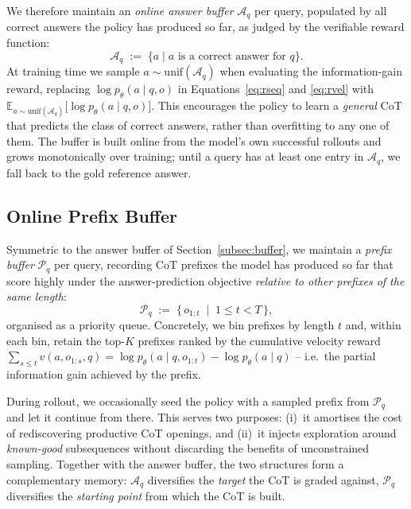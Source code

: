 \documentclass{article}
\begin{document}
We therefore maintain an \emph{online answer buffer} \(\mathcal{A}_q\) per
query, populated by all correct answers the policy has produced so far, as
judged by the verifiable reward function:
\begin{equation}
\mathcal{A}_q \;:=\; \{a \mid a \text{ is a correct answer for } q\}.
\label{eq:buffer}
\end{equation}
At training time we sample \(a \sim \mathrm{unif}(\mathcal{A}_q)\) when
evaluating the information-gain reward, replacing
\(\log p_\theta(a \mid q, o)\) in Equations~\ref{eq:rseq} and \ref{eq:rvel}
with
\(\mathbb{E}_{a \sim \mathrm{unif}(\mathcal{A}_q)}\!\bigl[\log p_\theta(a \mid q, o)\bigr]\).
This encourages the policy to learn a \emph{general} CoT that predicts the
class of correct answers, rather than overfitting to any one of them. The
buffer is built online from the model's own successful rollouts and grows
monotonically over training; until a query has at least one entry in
\(\mathcal{A}_q\), we fall back to the gold reference answer.

\subsection{Online Prefix Buffer}
\label{subsec:prefix}

Symmetric to the answer buffer of Section~\ref{subsec:buffer}, we maintain a
\emph{prefix buffer} \(\mathcal{P}_q\) per query, recording CoT prefixes the
model has produced so far that score highly under the answer-prediction objective
\emph{relative to other prefixes of the same length}:
\begin{equation}
\mathcal{P}_q \;:=\; \{\, o_{1:t} \;\mid\; 1 \le t < T \,\},
\label{eq:prefix-buffer}
\end{equation}
organised as a priority queue. Concretely, we bin prefixes by length \(t\)
and, within each bin, retain the top-\(K\) prefixes ranked by the cumulative
velocity reward
\(\sum_{s \le t} v(a, o_{1:s}, q) = \log p_\theta(a \mid q, o_{1:t}) - \log p_\theta(a \mid q)\)
-- i.e.\ the partial information gain achieved by the prefix.

During rollout, we occasionally seed the policy with a sampled prefix from
\(\mathcal{P}_q\) and let it continue from there. This serves two purposes:
(i)~it amortises the cost of rediscovering productive CoT openings, and
(ii)~it injects exploration around \emph{known-good} subsequences without
discarding the benefits of unconstrained sampling. Together with the answer
buffer, the two structures form a complementary memory: \(\mathcal{A}_q\)
diversifies the \emph{target} the CoT is graded against, \(\mathcal{P}_q\)
diversifies the \emph{starting point} from which the CoT is built.
\end{document}
